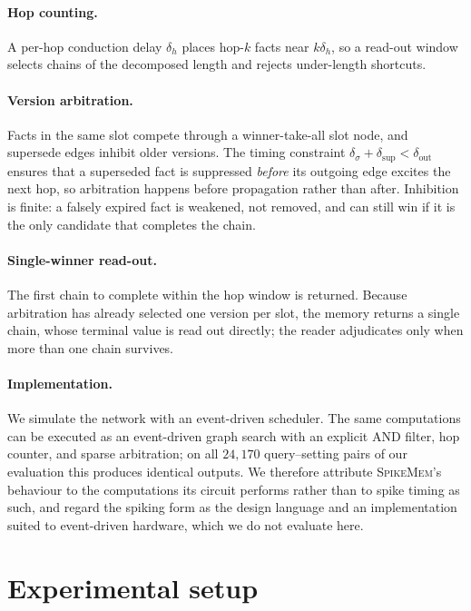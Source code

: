\documentclass[11pt]{article}
\newcommand{\sm}{\textsc{SpikeMem}}
\begin{document}
\paragraph{Hop counting.}
A per-hop conduction delay $\delta_h$ places hop-$k$ facts near $k\delta_h$, so a read-out window
selects chains of the decomposed length and rejects under-length shortcuts.

\paragraph{Version arbitration.}
Facts in the same slot compete through a winner-take-all slot node, and supersede edges inhibit older
versions. The timing constraint $\delta_\sigma+\delta_{\text{sup}}<\delta_{\text{out}}$ ensures that a
superseded fact is suppressed \emph{before} its outgoing edge excites the next hop, so arbitration
happens before propagation rather than after. Inhibition is finite: a falsely expired fact is
weakened, not removed, and can still win if it is the only candidate that completes the chain.

\paragraph{Single-winner read-out.}
The first chain to complete within the hop window is returned. Because arbitration has already
selected one version per slot, the memory returns a single chain, whose terminal value is read out
directly; the reader adjudicates only when more than one chain survives.

\paragraph{Implementation.}
We simulate the network with an event-driven scheduler. The same computations can be executed as an
event-driven graph search with an explicit AND filter, hop counter, and sparse arbitration; on all
$24{,}170$ query--setting pairs of our evaluation this produces identical outputs. We therefore
attribute \sm{}'s behaviour to the computations its circuit performs rather than to spike timing as
such, and regard the spiking form as the design language and an implementation suited to
event-driven hardware, which we do not evaluate here.

\section{Experimental setup}
\label{sec:setup}
\end{document}
